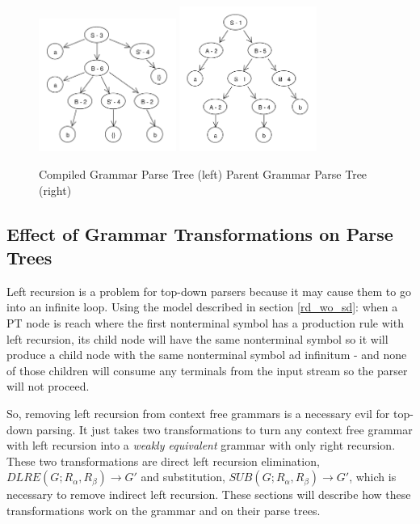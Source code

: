 \documentclass[11pt]{article}
\begin{document}
\begin{figure}[h!]
    \centering
    \includegraphics[width=0.4\textwidth,natwidth=458,natheight=444]{umlet/compiled_ex.pdf}
    \includegraphics[width=0.4\textwidth,natwidth=472,natheight=500]{umlet/decompiled_ex.pdf}
    \caption{Compiled Grammar Parse Tree (left) Parent Grammar Parse Tree (right)}
    \label{fig:comp_to_dec_ex}
\end{figure}

\subsection{Effect of Grammar Transformations on Parse Trees}
\label{gram_transforms}
Left recursion is a problem for top-down parsers because it may cause them to
go into an infinite loop. Using the model described in section \ref{rd_wo_sd}:
when a PT node is reach where the first nonterminal symbol has a production rule with
left recursion, its child node will have the same nonterminal symbol so it will produce
a child node with the same nonterminal symbol ad infinitum - and none of those children will
consume any terminals from the input stream so the parser will not proceed. 

So, removing left recursion from context free grammars is a necessary evil for top-down parsing.
It just takes two transformations to turn any context free grammar with left recursion
into a {\em weakly equivalent} grammar with only right recursion.
These two transformations are direct left recursion elimination, 
$DLRE(G; R_\alpha, R_\beta) \rightarrow G'$ and substitution, 
$SUB(G; R_\alpha, R_\beta) \rightarrow G'$, which is necessary to
remove indirect left recursion. \cite{aho, lewis}
These sections will describe how these transformations work on the grammar
and on their parse trees.
\end{document}
